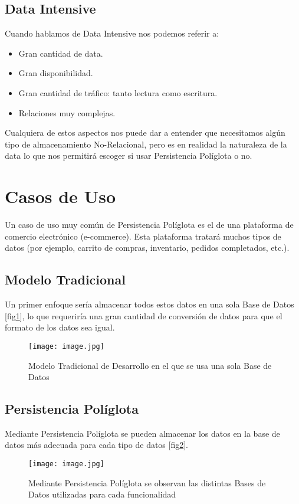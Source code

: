 \documentclass[conference,compsoc]{IEEEtran}
\begin{document}
\subsection{Data Intensive}
Cuando hablamos de Data Intensive nos podemos referir a:
\begin{itemize}
\item Gran cantidad de data.
\item Gran disponibilidad.
\item Gran cantidad de tráfico: tanto lectura como escritura.
\item Relaciones muy complejas.
\end{itemize}
Cualquiera de estos aspectos nos puede dar a entender que necesitamos algún tipo de almacenamiento No-Relacional, pero es en realidad la naturaleza de la data lo que nos permitirá escoger si usar Persistencia Políglota o no. 

\section{Casos de Uso}
Un caso de uso muy común de Persistencia Políglota es el de una plataforma de comercio electrónico (e-commerce). Esta plataforma tratará muchos tipos de datos (por ejemplo, carrito de compras, inventario, pedidos completados, etc.).\cite{art10} 
\\
\subsection{Modelo Tradicional}
Un primer enfoque sería almacenar todos estos datos en una sola Base de Datos [fig\ref{tradicional}], lo que requeriría una gran cantidad de conversión de datos para que el formato de los datos sea igual.
\\
\begin{figure}[!h]
\centering
\texttt{[image: image.jpg]}
\caption{Modelo Tradicional de Desarrollo en el que se usa una sola Base de Datos}
\label{tradicional}
\end{figure}

\subsection{Persistencia Políglota}
Mediante Persistencia Políglota se pueden almacenar los datos en la base de datos más adecuada para cada tipo de datos [fig\ref{persistencia}].
\\
\begin{figure}[!h]
\centering
\texttt{[image: image.jpg]}
\caption{Mediante Persistencia Políglota se observan las distintas Bases de Datos utilizadas para cada funcionalidad}
\label{persistencia}
\end{figure}
\end{document}

